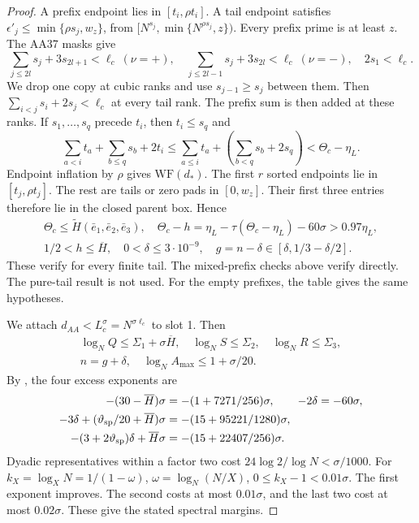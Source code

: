\begin{proof}
A prefix endpoint lies in $[t_i,\rho t_i]$.
A tail endpoint satisfies $\epsilon'_j\le\min\{\rho s_j,w_z\}$,
from $[N^{s_j},\min\{N^{\rho s_j},z\})$.
Every prefix prime is at least $z$.
The AA37 masks give
\[
 \sum_{j\le2l}s_j+3s_{2l+1}<\ell_c\ (\nu=+),\quad
 \sum_{j\le2l-1}s_j+3s_{2l}<\ell_c\ (\nu=-),\quad 2s_1<\ell_c.
\]
We drop one copy at cubic ranks and use $s_{j-1}\ge s_j$ between them.
Then $\sum_{i<j}s_i+2s_j<\ell_c$ at every tail rank.
The prefix sum is then added at these ranks.
If $s_1,\ldots,s_q$ precede $t_i$, then $t_i\le s_q$ and
\[
 \sum_{a<i}t_a+\sum_{b\le q}s_b+2t_i
 \le\sum_{a\le i}t_a+\left(\sum_{b<q}s_b+2s_q\right)
 <\Theta_c-\eta_L.
\]
Endpoint inflation by $\rho$ gives $\mathrm{WF}(d_*)$.
The first $r$ sorted endpoints lie in $[t_j,\rho t_j]$.
The rest are tails or zero pads in $[0,w_z]$.
Their first three entries therefore lie in the closed parent box.
Hence
\[
\begin{gathered}
 \Theta_c\le\widetilde H(\bar e_1,\bar e_2,\bar e_3),\quad
 \Theta_c-h=\eta_L-\tau(\Theta_c-\eta_L)-60\sigma>0.97\eta_L,\\
 1/2<h\le\overline H,\quad 0<\delta\le3\cdot10^{-9},\quad
 g=n-\delta\in[\delta,1/3-\delta/2].
\end{gathered}
\]
These verify \cite[Theorem~4.1, (4.2)]{Z1} for every finite tail.
The mixed-prefix checks above verify \cite[Theorem~4.1]{Z1} directly.
The pure-tail result \cite[Lemma~4.7]{Z1} is not used.
For the empty prefixes, the table gives the same hypotheses.

We attach $d_{AA}<L_c^\sigma=N^{\sigma\ell_c}$ to slot 1.
Then
\[
\begin{gathered}
 \log_NQ\le\Sigma_1+\sigma\overline H,\quad\log_NS\le\Sigma_2,\quad\log_NR\le\Sigma_3,\\
 n=g+\delta,\quad\log_NA_{\max}\le1+\sigma/20.
\end{gathered}
\]
By \cite[(4.3)]{Z1}, the four excess exponents are
\[
\begin{aligned}
 -(30-\overline H)\sigma&=-(1+7271/256)\sigma,\qquad -2\delta=-60\sigma,\\
 -3\delta+(\vartheta_{\rm sp}/20+\overline H)\sigma
 &=-(15+95221/1280)\sigma,\\
 -(3+2\vartheta_{\rm sp})\delta+\overline H\sigma
 &=-(15+22407/256)\sigma.
\end{aligned}
\]
Dyadic representatives within a factor two cost $24\log2/\log N<\sigma/1000$.
For $k_X=\log_XN=1/(1-\omega)$, $\omega=\log_N(N/X)$,
$0\le k_X-1<0.01\sigma$.
The first exponent improves.
The second costs at most $0.01\sigma$, and the last two cost at most $0.02\sigma$.
These give the stated spectral margins.


\end{proof}
